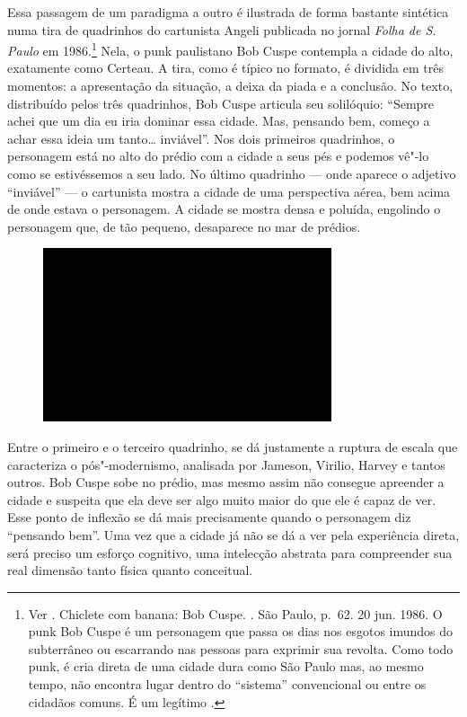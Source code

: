 Essa passagem de um paradigma a outro é ilustrada de forma bastante
sintética numa tira de quadrinhos do cartunista Angeli publicada no
jornal \emph{Folha de S. Paulo} em 1986.\footnote{Ver . Chiclete
  com banana: Bob Cuspe. {}. São Paulo, p.~62.
  20 jun. 1986. O punk Bob Cuspe é um personagem que passa os dias nos
  esgotos imundos do subterrâneo ou escarrando nas pessoas para exprimir
  sua revolta. Como todo punk, é cria direta de uma cidade dura como São
  Paulo mas, ao mesmo tempo, não encontra lugar dentro do ``sistema''
  convencional ou entre os cidadãos comuns. É um legítimo
  {}.} Nela, o punk paulistano Bob Cuspe contempla a cidade
do alto, exatamente como Certeau. A tira, como é típico no formato, é
dividida em três momentos: a apresentação da situação, a deixa da piada
e a conclusão. No texto, distribuído pelos três quadrinhos, Bob Cuspe
articula seu solilóquio: ``Sempre achei que um dia eu iria dominar essa
cidade. Mas, pensando bem, começo a achar essa ideia um
tanto\ldots{} inviável''. Nos dois primeiros quadrinhos, o personagem
está no alto do prédio com a cidade a seus pés e podemos vê"-lo como se
estivéssemos a seu lado. No último quadrinho --- onde aparece o adjetivo
``inviável'' --- o cartunista mostra a cidade de uma perspectiva aérea,
bem acima de onde estava o personagem. A cidade se mostra densa e
poluída, engolindo o personagem que, de tão pequeno, desaparece no mar
de prédios.

\begin{figure}[!ht]
\centering
 \includegraphics[width=85mm]{./imgs/im1.jpg}
\caption{\tiny{}}
\end{figure}

Entre o primeiro e o terceiro quadrinho, se dá justamente a ruptura de
escala que caracteriza o pós"-modernismo, analisada por Jameson, Virilio,
Harvey e tantos outros. Bob Cuspe sobe no prédio, mas mesmo assim não
consegue apreender a cidade e suspeita que ela deve ser algo muito maior
do que ele é capaz de ver. Esse ponto de inflexão se dá mais
precisamente quando o personagem diz ``pensando bem''. Uma vez que a
cidade já não se dá a ver pela experiência direta, será preciso um
esforço cognitivo, uma intelecção abstrata para compreender sua real
dimensão tanto física quanto conceitual.

